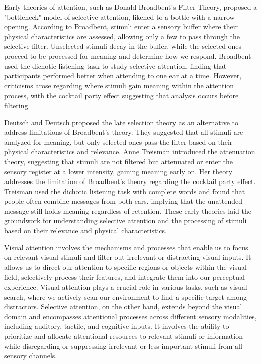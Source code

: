 Early theories of attention, such as Donald Broadbent's Filter Theory, proposed a "bottleneck" model of selective attention, likened to a bottle with a narrow opening. According to Broadbent, stimuli enter a sensory buffer where their physical characteristics are assessed, allowing only a few to pass through the selective filter. Unselected stimuli decay in the buffer, while the selected ones proceed to be processed for meaning and determine how we respond. Broadbent used the dichotic listening task to study selective attention, finding that participants performed better when attending to one ear at a time. However, criticisms arose regarding where stimuli gain meaning within the attention process, with the cocktail party effect suggesting that analysis occurs before filtering.

Deutsch and Deutsch proposed the late selection theory as an alternative to address limitations of Broadbent's theory. They suggested that all stimuli are analyzed for meaning, but only selected ones pass the filter based on their physical characteristics and relevance. Anne Treisman introduced the attenuation theory, suggesting that stimuli are not filtered but attenuated or enter the sensory register at a lower intensity, gaining meaning early on. Her theory addresses the limitation of Broadbent's theory regarding the cocktail party effect. Treisman used the dichotic listening task with complete words and found that people often combine messages from both ears, implying that the unattended message still holds meaning regardless of retention. These early theories laid the groundwork for understanding selective attention and the processing of stimuli based on their relevance and physical characteristics.

Visual attention involves the mechanisms and processes that enable us to focus on relevant visual stimuli and filter out irrelevant or distracting visual inputs. It allows us to direct our attention to specific regions or objects within the visual field, selectively process their features, and integrate them into our perceptual experience. Visual attention plays a crucial role in various tasks, such as visual search, where we actively scan our environment to find a specific target among distractors. Selective attention, on the other hand, extends beyond the visual domain and encompasses attentional processes across different sensory modalities, including auditory, tactile, and cognitive inputs. It involves the ability to prioritize and allocate attentional resources to relevant stimuli or information while disregarding or suppressing irrelevant or less important stimuli from all sensory channels.


